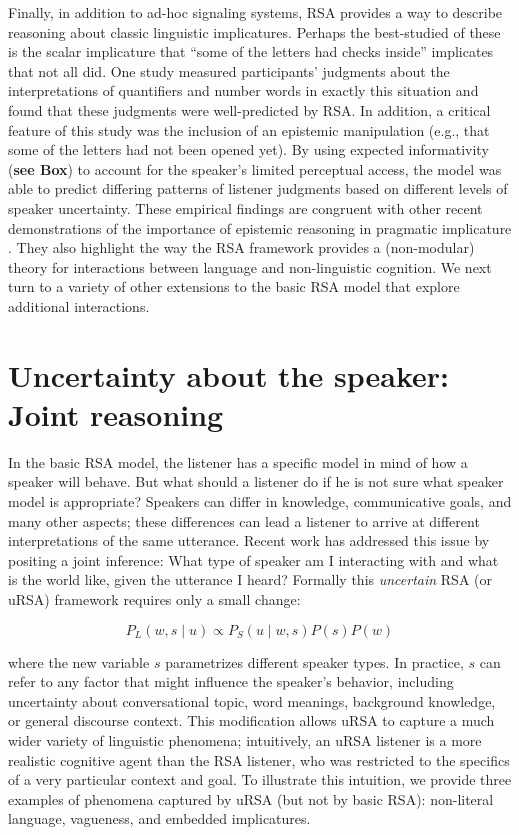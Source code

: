 \documentclass[]{elsarticle}
\begin{document}
Finally, in addition to ad-hoc signaling systems, RSA provides a way to describe reasoning about classic linguistic
implicatures. Perhaps the
best-studied of these is the scalar implicature that ``some of the
letters had checks inside'' implicates that not all did. 
One study \citep{goodman2013} measured participants' judgments about the
interpretations of quantifiers and number words in exactly this
situation and found that these judgments were well-predicted by RSA. In
addition, a critical feature of this study was the inclusion of an
epistemic manipulation (e.g., that some of the letters had not been opened
yet). By using expected informativity (\textbf{see Box}) to account for the speaker's
limited perceptual access, the model was able to predict
differing patterns of listener judgments based on different levels of
speaker uncertainty. These empirical findings are congruent with other recent
demonstrations of the importance of epistemic reasoning in pragmatic
implicature \citep[e.g.,]{bergen2012,breheny2013}. They
also highlight the way the RSA framework provides a (non-modular) theory
for interactions between language and non-linguistic cognition.
We next turn to a variety of other extensions to the basic RSA model that explore additional interactions.

\section{Uncertainty about the speaker: Joint reasoning}\label{uncertainty-about-the-speaker-joint-reasoning}

In the basic RSA model, the listener has a specific model in mind of how
a speaker will behave. But what should a listener do if he is not sure
what speaker model is appropriate? Speakers can differ in knowledge, communicative goals, and many other aspects; 
these differences can lead a listener to arrive at different interpretations of the same utterance.
Recent work has addressed this issue by positing a joint inference: What type of speaker am I
interacting with and what is the world like, given the utterance I
heard? Formally this \emph{uncertain} RSA (or uRSA) framework requires
only a small change:

$$P_L(w,s\mid u) \propto
P_S(u\mid w,s)P(s)P(w)$$

where the new variable $s$ parametrizes different speaker types. In practice, $s$ can
refer to any factor that might influence the speaker's behavior,
including uncertainty about conversational topic, word
meanings, background knowledge, or general discourse context.
This modification allows uRSA to capture a much wider variety of
linguistic phenomena; intuitively, an uRSA listener is a more realistic
cognitive agent than the RSA listener, who was restricted to the
specifics of a very particular context and goal. To illustrate this
intuition, we provide three examples of phenomena captured by uRSA (but not by basic RSA): non-literal language, vagueness, and embedded implicatures.
\end{document}
